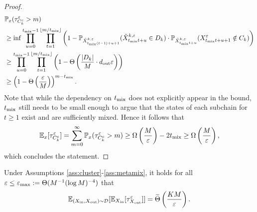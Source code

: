 \begin{proof}
\begin{align*}
&\mathbb{P}_x(\tau_{C_k^c}^\varepsilon > m)\\
&\ge\inf \prod_{u=0}^{t_{\operatorname{mix}}-1} \prod_{t=1}^{\lfloor m/t_{\operatorname{mix}}\rfloor} \left(1-\mathbb{P}_{\tilde{X}_{t_{\operatorname{mix}}(t-1)+u+1}^{k,\varepsilon}}(\tilde{X}_{t_{\operatorname{mix}}t+u}^{k,\varepsilon}\in D_k) \cdot \mathbb{P}_{\tilde{X}_{t_{\operatorname{mix}}t+u}^{k,\varepsilon}}(X_{t_{\operatorname{mix}}t+u+1}^\varepsilon\notin C_k)\right) \\
&\ge\prod_{u=0}^{t_{\operatorname{mix}}-1} \prod_{t=1}^{\lfloor m/t_{\operatorname{mix}}\rfloor} \left(1-\Theta\left(\frac{|D_k|}{M}\cdot d_{\operatorname{out}}\varepsilon\right)\right) \\
&\ge \left(1-\Theta\left(\frac{\varepsilon}{M}\right)\right)^{m-t_{\operatorname{mix}}}.
\end{align*}
Note that while the dependency on $t_{\operatorname{mix}}$ does not explicitly appear in the bound, $t_{\operatorname{mix}}$ still needs to be small enough to argue that the states of each subchain for $t\ge 1$ exist and are sufficiently mixed. Hence it follows that
\begin{align*}
\mathbb{E}_{x}[\tau_{C_k^c}^\varepsilon] = \sum_{m=0}^\infty \mathbb{P}_x(\tau_{C_k^c}^\varepsilon > m) \ge \Omega\left(\frac{M}{\varepsilon}\right) - 2t_{\operatorname{mix}} \ge \Omega\left(\frac{M}{\varepsilon}\right),
\end{align*}
which concludes the statement.
\end{proof}

\begin{thm}
Under Assumptions \ref{ass:cluster}-\ref{ass:metamix}, it holds for all $\varepsilon \le\varepsilon_{\max}:= \Theta(M^{-1}(\log M)^{-4})$ that
\begin{equation*}
\mathbb{E}_{(X_{\operatorname{in}},X_{\operatorname{out}})\sim\mathcal{D}}[\mathbb{E}_{X_{\operatorname{in}}}[\tau_{X_{\operatorname{out}}}^\varepsilon]] = \widetilde{\Theta}\left(\frac{KM}{\varepsilon}\right).
\end{equation*}
\end{thm}

